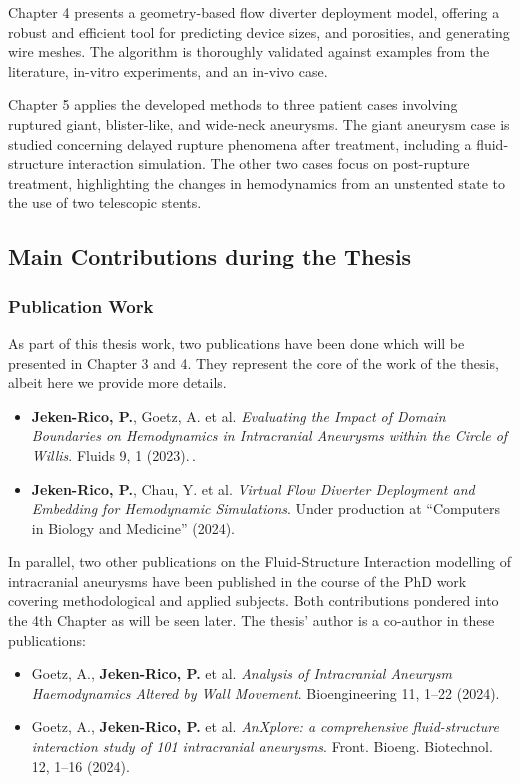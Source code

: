 Chapter 4 presents a geometry-based flow diverter deployment model, offering a robust and efficient tool for predicting device sizes, and porosities, and generating wire meshes. The algorithm is thoroughly validated against examples from the literature, in-vitro experiments, and an in-vivo case.

Chapter 5 applies the developed methods to three patient cases involving ruptured giant, blister-like, and wide-neck aneurysms. The giant aneurysm case is studied concerning delayed rupture phenomena after treatment, including a fluid-structure interaction simulation. The other two cases focus on post-rupture treatment, highlighting the changes in hemodynamics from an unstented state to the use of two telescopic stents.


\subsection{Main Contributions during the Thesis}

\subsubsection*{Publication Work}
As part of this thesis work, two publications have been done which will be presented in Chapter 3 and 4. They represent the core of the work of the thesis, albeit here we provide more details.
\begin{itemize}
	\item \textbf{Jeken-Rico, P.}, Goetz, A. et al. \textit{Evaluating the Impact of Domain Boundaries on Hemodynamics in Intracranial Aneurysms within the Circle of Willis}. Fluids 9, 1 (2023).\,\cite{Jeken-Rico2023}.
	\item \textbf{Jeken-Rico, P.}, Chau, Y. et al. \textit{Virtual Flow Diverter Deployment and Embedding for Hemodynamic Simulations}. Under production at ``Computers in Biology and Medicine'' (2024).
\end{itemize}


In parallel, two other publications on the Fluid-Structure Interaction modelling of intracranial aneurysms have been published in the course of the PhD work covering methodological and applied subjects. Both contributions pondered into the 4th Chapter as will be seen later. The thesis' author is a co-author in these publications:
\begin{itemize}
	\item Goetz, A., \textbf{Jeken-Rico, P.} et al. \textit{Analysis of Intracranial Aneurysm Haemodynamics Altered by Wall Movement}. Bioengineering 11, 1–22 (2024).
	\item Goetz, A., \textbf{Jeken-Rico, P.} et al. \textit{AnXplore: a comprehensive fluid-structure interaction study of 101 intracranial aneurysms}. Front. Bioeng. Biotechnol. 12, 1–16 (2024).
\end{itemize}


